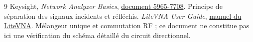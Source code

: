 \documentclass[11pt,a4paper]{article}
\begin{document}
\begin{thebibliography}{9}
 Keysight, \emph{Network Analyzer Basics},
\href{https://www.keysight.com/us/en/assets/3119-1082/application-notes/5965-7708.pdf}{document 5965-7708}.
Principe de séparation des signaux incidents et réfléchis.
 \emph{LiteVNA User Guide},
\href{https://nanovna.com/wp-content/uploads/2021/11/LiteVNA_User-Guide.pdf}{manuel du LiteVNA}.
Mélangeur unique et commutation RF ; ce document ne constitue pas ici une
vérification du schéma détaillé du circuit directionnel.
\end{thebibliography}
\end{document}
